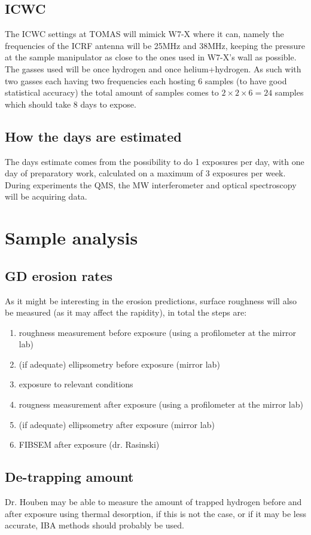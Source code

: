 \documentclass{article}
\begin{document}
\subsection*{ICWC}
The ICWC settings at TOMAS will mimick W7-X where it can, namely the
frequencies of the ICRF antenna will be 25MHz and 38MHz, keeping the pressure
at the sample manipulator as close to the ones used in W7-X's wall as possible.
The gasses used will be once hydrogen and once helium+hydrogen. As such with two
gasses each having two frequencies each hosting 6 samples (to have good
statistical accuracy) the total amount of samples comes to $2\times 2\times
6=24$ samples which should take 8 days to expose.
\subsection*{How the days are estimated}
The days estimate comes from the possibility to do 1 exposures per day,
with one day of preparatory work, calculated on a maximum of 3 exposures per week.
During experiments the QMS, the MW interferometer and optical spectroscopy will
be acquiring data.
\section{Sample analysis}
\subsection*{GD erosion rates}
As it might be interesting in the erosion predictions, surface roughness will also be measured
(as it may affect the rapidity), in total the steps are:
\begin{enumerate}
    \item roughness measurement before exposure (using a profilometer at the mirror lab)
    \item (if adequate) ellipsometry before exposure (mirror lab)
    \item exposure to relevant conditions
    \item rougness measurement after exposure (using a profilometer at the mirror lab)
    \item (if adequate) ellipsometry after exposure (mirror lab)
    \item FIBSEM after exposure (dr. Rasinski)
\end{enumerate}
\subsection*{De-trapping amount}
Dr. Houben may be able to measure the amount of trapped hydrogen before and
after exposure using thermal desorption, if this is not the case, or if it may
be less accurate, IBA methods should probably be used.


\end{document}
